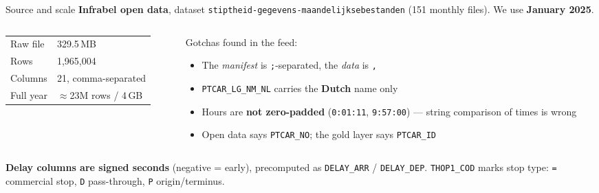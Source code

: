 \documentclass[aspectratio=169,10pt]{beamer}
\newcommand{\srcnote}[1]{{\scriptsize\color{ink3}#1}}
\begin{document}
\begin{frame}{Source and scale}
  \textbf{Infrabel open data}, dataset \texttt{stiptheid-gegevens-maandelijksebestanden}
  (151 monthly files). We use \textbf{January 2025}.

  \vspace{0.8em}
  \begin{columns}[T]
    \begin{column}{0.52\textwidth}
      \begin{tabular}{@{}ll@{}}
        \toprule
        Raw file & 329.5\,MB \\
        Rows & 1{,}965{,}004 \\
        Columns & 21, comma-separated \\
        Full year & $\approx$23M rows / 4\,GB \\
        \bottomrule
      \end{tabular}
    \end{column}
    \begin{column}{0.46\textwidth}
      \srcnote{Gotchas found in the feed:}
      \begin{itemize}\small
        \item The \emph{manifest} is \texttt{;}-separated, the \emph{data} is \texttt{,}
        \item \texttt{PTCAR\_LG\_NM\_NL} carries the \textbf{Dutch} name only
        \item Hours are \textbf{not zero-padded} (\texttt{0:01:11}, \texttt{9:57:00}) ---
          string comparison of times is wrong
        \item Open data says \texttt{PTCAR\_NO}; the gold layer says \texttt{PTCAR\_ID}
      \end{itemize}
    \end{column}
  \end{columns}

  \vspace{0.8em}
  \textbf{Delay columns are signed seconds} (negative = early), precomputed as
  \texttt{DELAY\_ARR} / \texttt{DELAY\_DEP}. \texttt{THOP1\_COD} marks stop type:
  \texttt{=} commercial stop, \texttt{D} pass-through, \texttt{P} origin/terminus.
\end{frame}
\end{document}
